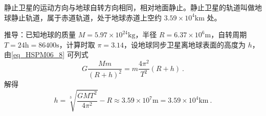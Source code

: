 静止卫星的运动方向与地球自转方向相同，相对地面静止。静止卫星的轨道叫做地球静止轨道，属于赤道轨道，处于地球赤道上空约 $3.59\times10^4\mathrm{km}$ 处。

推导：已知地球的质量 $M=5.97\times10^{24}\mathrm{kg}$，半径 $R=6.37\times10^6\mathrm{m}$，自转周期 $T=24\mathrm{h}=86400\mathrm{s}$，计算时取 $\pi=3.14$，设地球同步卫星离地球表面的高度为 $h$，由\autoref{eq_HSPM06_8} 可列式
\begin{equation}
G\frac{Mm}{(R+h)^2}= m\frac{4\pi^2}{T^2}(R+h)~.
\end{equation}
解得
\begin{equation}
h=\sqrt[3]{\frac{GMT^2}{4\pi^2}}-R \approx 3.59\times10^7\mathrm{m}=3.59\times10^4\mathrm{km}~.
\end{equation}

